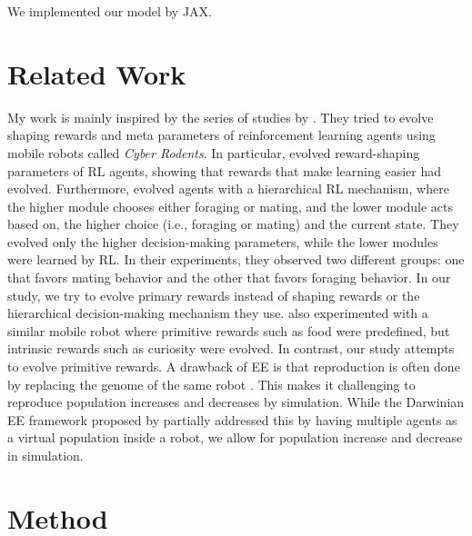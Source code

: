 We implemented our model by JAX.

\section{Related Work}
My work is mainly inspired by the series of studies by \citet{elfwingBiologicallyInspiredEmbodied2005,elfwing
  DarwinianEmbodiedEvolution2011a,elfwingEmergencePolymorphicMating2014}. They tried to evolve shaping rewards and meta parameters of reinforcement learning agents using mobile robots called \textit{Cyber Rodents}. In particular, \citet{elfwingDarwinianEmbodiedEvolution2011a} evolved reward-shaping parameters of RL agents, showing that rewards that make learning easier had evolved. Furthermore, \citet{elfwingEmergencePolymorphicMating2014} evolved agents with a hierarchical RL mechanism, where the higher module chooses either foraging or mating, and the lower module acts based on, the higher choice (i.e., foraging or mating) and the current state. They evolved only the higher decision-making parameters, while the lower modules were learned by RL\@. In their experiments, they observed two different groups: one that favors mating behavior and the other that favors foraging behavior. In our study, we try to evolve primary rewards instead of shaping rewards or the hierarchical decision-making mechanism they use. \citet{uchibeFindingIntrinsicRewards2008} also experimented with a similar mobile robot where primitive rewards such as food were predefined, but intrinsic rewards such as curiosity were evolved. In contrast, our study attempts to evolve primitive rewards. A drawback of EE is that reproduction is often done by replacing the genome of the same robot \citep{bredecheEmbodiedEvolutionCollective2018}. This makes it challenging to reproduce population increases and decreases by simulation. While the Darwinian EE framework proposed by \citet{elfwingDarwinianEmbodiedEvolution2011a} partially addressed this by having multiple agents as a virtual population inside a robot, we allow for population increase and decrease in simulation.

\section{Method}
